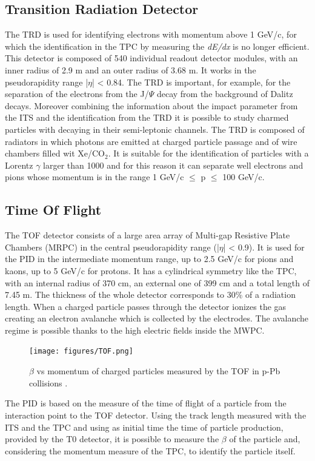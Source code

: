 \subsection*{Transition Radiation Detector}
The TRD is used for identifying electrons with momentum above 1 GeV/c, for which the identification in the TPC by measuring the \textit{dE/dx} is no longer efficient. This detector is composed of 540 individual readout detector modules, with an inner radius of 2.9 m and an outer radius of 3.68 m. It works in the pseudorapidity range |$\eta$| < 0.84. The TRD is important, for example, for the separation of the electrons from the J/$\Psi$ decay from the background of Dalitz decays. Moreover combining the information about the impact parameter from the ITS and the identification from the TRD it is possible to study charmed particles with decaying in their semi-leptonic channels. The TRD is composed of radiators in which photons are emitted at charged particle passage and of wire chambers filled wit Xe/CO$_2$. It is suitable for the identification of particles with a Lorentz $\gamma$ larger than 1000 and for this reason it can separate well electrons and pions whose momentum is in the range 1 GeV/c $\leq$ p $\leq$ 100 GeV/c.
\subsection*{Time Of Flight}
The TOF detector consists of a large area array of Multi-gap Resistive Plate Chambers (MRPC) in the central pseudorapidity range (|$\eta$| < 0.9). It is used for the PID in the intermediate momentum range, up to 2.5 GeV/c for pions and kaons, up to 5 GeV/c for protons. It has a cylindrical symmetry like the TPC, with an internal radius of 370 cm, an external one of 399 cm and a total length of 7.45 m. The thickness of the whole detector corresponds to 30\% of a radiation length. When a charged particle passes through the detector ionizes the gas creating an electron avalanche which is collected by the electrodes. The avalanche regime is possible thanks to the high electric fields inside the MWPC.\\
%
\begin{figure}
  \centering
  \texttt{[image: figures/TOF.png]}
  \caption{$\beta$ vs momentum of charged particles measured by the TOF in p-Pb collisions \cite{alice2014performance}.}
  \label{fig:TOF}
\end{figure}
%
The PID is based on the measure of the time of flight of a particle from the interaction point to the TOF detector. Using the track length measured with the ITS and the TPC and using as initial time the time of particle production, provided by the T0 detector, it is possible to measure the $\beta$ of the particle and, considering the momentum measure of the TPC, to identify the particle itself.\\
